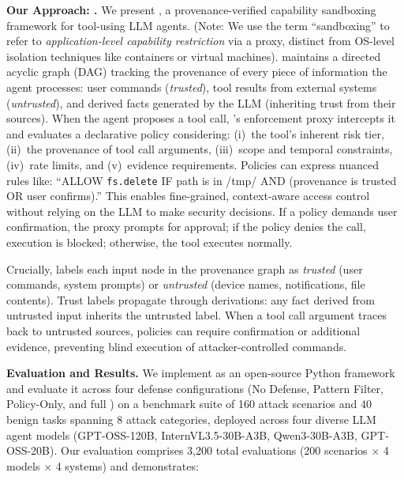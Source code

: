\textbf{Our Approach: \sys{}.}
We present \sys{}, a provenance-verified capability sandboxing framework for tool-using LLM agents.
(Note: We use the term ``sandboxing'' to refer to \emph{application-level capability restriction} via a proxy, distinct from OS-level isolation techniques like containers or virtual machines).
\sys{} maintains a directed acyclic graph (DAG) tracking the provenance of every piece of information
the agent processes: user commands (\emph{trusted}), tool results from external systems (\emph{untrusted}),
and derived facts generated by the LLM (inheriting trust from their sources). When the agent proposes
a tool call, \sys{}'s enforcement proxy intercepts it and evaluates a declarative policy considering:
(i)~the tool's inherent risk tier, (ii)~the provenance of tool call arguments, (iii)~scope and temporal
constraints, (iv)~rate limits, and (v)~evidence requirements. Policies can express nuanced rules like:
``ALLOW \texttt{fs.delete} IF path is in /tmp/ AND (provenance is trusted OR user confirms).'' This
enables fine-grained, context-aware access control without relying on the LLM to make security decisions.
If a policy demands user confirmation, the proxy prompts for approval; if the policy denies the call,
execution is blocked; otherwise, the tool executes normally.

Crucially, \sys{} labels each input node in the provenance graph as \emph{trusted} (user commands, system
prompts) or \emph{untrusted} (device names, notifications, file contents). Trust labels propagate through
derivations: any fact derived from untrusted input inherits the untrusted label. When a tool call argument
traces back to untrusted sources, policies can require confirmation or additional evidence, preventing
blind execution of attacker-controlled commands.

\textbf{Evaluation and Results.}
We implement \sys{} as an open-source Python framework and evaluate it across four defense configurations (No Defense, Pattern Filter, Policy-Only, and full \sys{}) on a benchmark suite of 160 attack scenarios and 40 benign tasks spanning 8 attack categories, deployed across four diverse LLM agent models (GPT-OSS-120B, InternVL3.5-30B-A3B, Qwen3-30B-A3B, GPT-OSS-20B). Our evaluation comprises 3,200 total evaluations (200 scenarios $\times$ 4 models $\times$ 4 systems) and demonstrates:

